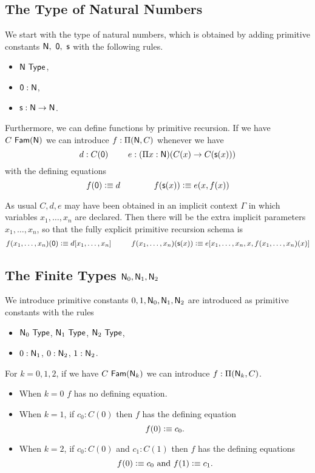 {\subsection*{The Type of Natural Numbers}
We start with
the type of natural numbers, which  is obtained by adding primitive constants
${\sf N},~{\sf 0},~{\sf s}$ with the following rules.
\begin{itemize}
\item ${\sf N}~{\sf Type}$,
\item ${\sf 0}:{\sf N}$,
\item ${\sf s}:{\sf N}\rightarrow {\sf N}$.
\end{itemize}

 Furthermore, we can define functions by primitive recursion.  If we have
$C~{\sf Fam}({\sf N})$ we can introduce $f:\Pi({\sf N},C)$ whenever we have
$$
d:C({\sf 0})~~~~~~~e:(\Pi x:{\sf N})(C(x)\rightarrow C({\sf s} (x)))
$$
with the defining equations
$$
f({\sf 0}) \vcentcolon\equiv d~~~~~~~~~~~~f({\sf s} (x)) \vcentcolon\equiv e(x,f(x))
$$
 
As usual $C,d,e$ may have been obtained in an implicit context $\Gamma$ in which variables $x_1,\ldots,x_n$ are declared.  Then there will be the extra implicit parameters $x_1,\ldots,x_n$, so that the fully explicit primitive recursion schema is
$$
f(x_1,\dots,x_n)({\sf 0}) \vcentcolon\equiv d[x_1,\dots,x_n]~~~~~~~~f(x_1,\dots,x_n)({\sf s} (x)) \vcentcolon\equiv e[x_1,\dots,x_n,x,f(x_1,\dots,x_n)(x)]
$$

\medskip
\subsection*{The Finite Types ${\sf N}_0,{\sf N}_1,{\sf N}_2$}

We introduce primitive constants $0,1,{\sf N}_0,{\sf N}_1,{\sf N}_2$ are introduced as primitive constants with the rules

\begin{itemize}
\item ${\sf N}_0~{\sf Type}$, ${\sf N}_1~{\sf Type}$, ${\sf N}_2~{\sf Type}$,
\item $0:{\sf N}_1$, $0:{\sf N}_2$, $1:{\sf N}_2$.
\end{itemize}
 For $k=0,1,2$, if we have $C~{\sf Fam}({\sf N}_k)$ we can introduce $f:\Pi({\sf N}_k,C)$.  
\begin{itemize}
\item When $k=0$ $f$ has no defining equation.  
\item When $k=1$, if $c_0:C(0)$ then $f$ has the defining equation
  \[ f(0)\vcentcolon\equiv c_0.\]
\item When $k=2$, if $c_0:C(0)$ and $c_1:C(1)$ then $f$ has the defining equations
  \[ f(0)\vcentcolon\equiv c_0\mbox{ and } f(1)\vcentcolon\equiv c_1.\]
\end{itemize}
}
